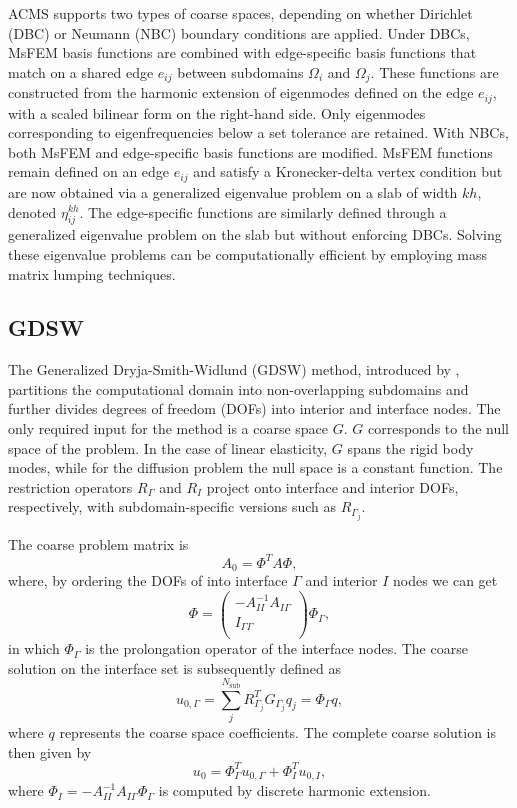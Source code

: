 ACMS supports two types of coarse spaces, depending on whether Dirichlet (DBC) or Neumann (NBC) boundary conditions are applied. Under DBCs, MsFEM basis functions are combined with edge-specific basis functions that match on a shared edge $e_{ij}$ between subdomains $\Omega_i$ and $\Omega_j$. These functions are constructed from the harmonic extension of eigenmodes defined on the edge $e_{ij}$, with a scaled bilinear form on the right-hand side. Only eigenmodes corresponding to eigenfrequencies below a set tolerance are retained. With NBCs, both MsFEM and edge-specific basis functions are modified. MsFEM functions remain defined on an edge $e_{ij}$ and satisfy a Kronecker-delta vertex condition but are now obtained via a generalized eigenvalue problem on a slab of width $kh$, denoted $\eta^{kh}_{ij}$. The edge-specific functions are similarly defined through a generalized eigenvalue problem on the slab but without enforcing DBCs. Solving these eigenvalue problems can be computationally efficient by employing mass matrix lumping techniques.
 
\subsection{GDSW}
The Generalized Dryja-Smith-Widlund (GDSW) method, introduced by \cite{gdsw_coarse_space_Dohrmann2008}, partitions the computational domain into non-overlapping subdomains and further divides degrees of freedom (DOFs) into interior and interface nodes. The only required input for the method is a coarse space $G$. $G$ corresponds to the null space of the problem. In the case of linear elasticity, $G$ spans the rigid body modes, while for the diffusion problem the null space is a constant function. The restriction operators $R_{\Gamma}$ and $R_I$ project onto interface and interior DOFs, respectively, with subdomain-specific versions such as $R_{\Gamma_j}$.

The coarse problem matrix is \cite[Equation 2]{ams_coarse_space_comp_study_Alves2024}
\[
    A_0 = \Phi^T A \Phi,
\]
where, by ordering the DOFs of into interface $\Gamma$ and interior $I$ nodes we can get \cite[Equation 4,5]{ams_coarse_space_comp_study_Alves2024}
\[
    \Phi = 
    \begin{pmatrix}
        -A_{II}^{-1} A_{I\Gamma} \\
        I_{\Gamma\Gamma} \\
    \end{pmatrix} \Phi_{\Gamma},
\]
in which $\Phi_{\Gamma}$ is the prolongation operator of the interface nodes. The coarse solution on the interface set is subsequently defined as
\[
    u_{0,\Gamma} = \sum_{j}^{N_{\text{sub}}} R^T_{\Gamma_j} G_{\Gamma_j} q_j = \Phi_{\Gamma} q,
\]
where $q$ represents the coarse space coefficients. The complete coarse solution is then given by 
\[
    u_0 = \Phi^T_{\Gamma} u_{0,\Gamma} + \Phi^T_I u_{0,I},
\]
where $\Phi_I = -A_{II}^{-1} A_{I\Gamma} \Phi_{\Gamma}$ is computed by discrete harmonic extension. 

